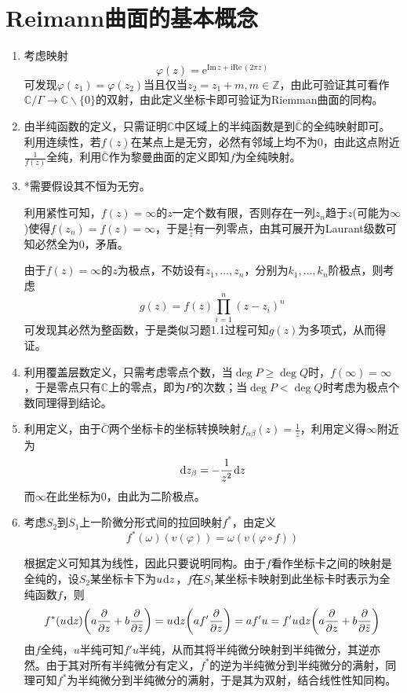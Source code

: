 \documentclass[a4paper,UTF8,fontset=windows,10pt]{ctexart}
\newcommand*{\er}{\mathrm{e}}
\newcommand*{\ir}{\mathrm{i}}
\newcommand*{\dr}{\hspace{0.07em}\mathrm{d}}
\newcommand*{\im}{\mathrm{Im}\,}
\newcommand*{\re}{\mathrm{Re}\,}
\begin{document}
\section{Reimann曲面的基本概念}
\begin{enumerate}
    \item 考虑映射
    $$\varphi(z)=\er^{\im z+\ir\re(2\pi z)}$$
    可发现$\varphi(z_1)=\varphi(z_2)$当且仅当$z_2=z_1+m,m\in\mathbb{Z}$，由此可验证其可看作$\mathbb{C}/\Gamma\to\mathbb{C}\backslash\{0\}$的双射，由此定义坐标卡即可验证为Riemman曲面的同构。

    \item 由半纯函数的定义，只需证明$\mathbb{C}$中区域上的半纯函数是到$\bar{\mathbb{C}}$的全纯映射即可。利用连续性，若$f(z)$在某点上是无穷，必然有邻域上均不为0，由此这点附近$\frac{1}{f(z)}$全纯，利用$\bar{\mathbb{C}}$作为黎曼曲面的定义即知$f$为全纯映射。
    
    \item *需要假设其不恒为无穷。
    
    利用紧性可知，$f(z)=\infty$的$z$一定个数有限，否则存在一列$z_n$趋于$z$(可能为$\infty$)使得$f(z_n)=f(z)=\infty$，于是$\frac{1}{z}$有一列零点，由其可展开为Laurant级数可知必然全为0，矛盾。

    由于$f(z)=\infty$的$z$为极点，不妨设有$z_1,\dots,z_n$，分别为$k_1,\dots,k_n$阶极点，则考虑
    $$g(z)=f(z)\prod_{i=1}^n(z-z_i)^n$$
    可发现其必然为整函数，于是类似习题1.1过程可知$g(z)$为多项式，从而得证。

    \item 利用覆盖层数定义，只需考虑零点个数，当$\deg P\ge\deg Q$时，$f(\infty)=\infty$，于是零点只有$\mathbb{C}$上的零点，即为$P$的次数；当$\deg P<\deg Q$时考虑为极点个数同理得到结论。
    
    \item 利用定义，由于$\bar{C}$两个坐标卡的坐标转换映射$f_{\alpha\beta}(z)=\frac{1}{z}$，利用定义得$\infty$附近为
    $$\dr z_\beta=-\frac{1}{z^2}\dr z$$
    而$\infty$在此坐标为0，由此为二阶极点。

    \item 考虑$S_2$到$S_1$上一阶微分形式间的拉回映射$f^*$，由定义
    $$f^*(\omega)(v(\varphi))=\omega(v(\varphi\circ f))$$

    根据定义可知其为线性，因此只要说明同构。由于$f$看作坐标卡之间的映射是全纯的，设$S_2$某坐标卡下为$u\dr z$，$f$在$S_1$某坐标卡映射到此坐标卡时表示为全纯函数$f$，则
    $$f^*(u\dr z)\bigg(a\frac{\partial}{\partial z}+b\frac{\partial}{\partial\bar{z}}\bigg)=u\dr z\bigg(a f'\frac{\partial}{\partial z}\bigg)=af'u=f'u\dr z\bigg(a\frac{\partial}{\partial z}+b\frac{\partial}{\partial\bar{z}}\bigg)$$
    由$f$全纯，$u$半纯可知$f'u$半纯，从而其将半纯微分映射到半纯微分，其逆亦然。由于其对所有半纯微分有定义，$f^*$的逆为半纯微分到半纯微分的满射，同理可知$f^*$为半纯微分到半纯微分的满射，于是其为双射，结合线性性知同构。


\end{enumerate}
\end{document}
